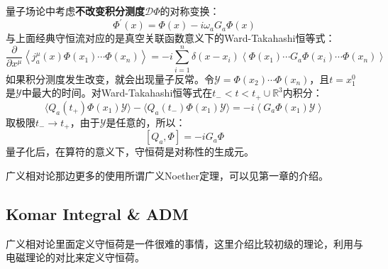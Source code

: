 量子场论中考虑\textbf{不改变积分测度$\mathcal{D}\Phi$}的对称变换：
\begin{equation}
	\Phi^{\prime}(x)=\Phi(x)-i\omega_aG_a\Phi(x)
\end{equation}
与上面经典守恒流对应的是真空关联函数意义下的Ward-Takahashi恒等式：
\begin{equation}
	\boxed{
		\frac\partial{\partial x^\mu}\left\langle j_a^\mu(x)\Phi(x_1)\cdots\Phi(x_n)\right\rangle   
		=-i\sum_{i=1}^n\delta(x-x_i)\left<\Phi(x_1)\cdots G_a\Phi(x_i)\cdots\Phi(x_n)\right>
	}
\end{equation}
如果积分测度发生改变，就会出现量子反常\cite{Bilal:2008qx}。令$\mathcal{Y}=\Phi(x_2)\cdots\Phi(x_n)$，且$t=x_1^0$是$\mathcal{Y}$中最大的时间。对Ward-Takahashi恒等式在${t_-<t<t_+}\cup \mathbb{R}^3$内积分：
\begin{equation}
	\langle Q_a(t_+)\Phi(x_1)\mathcal{Y}\rangle-\langle Q_a(t_-)\Phi(x_1)\mathcal{Y}\rangle=-i\left\langle G_a\Phi(x_1)\mathcal{Y}\right\rangle
\end{equation}
取极限$t_-\to t_+$，由于$\mathcal{Y}$是任意的，所以：
\begin{equation}
	\boxed{
	[Q_a,\Phi]=-iG_a\Phi }
\end{equation}
量子化后，在算符的意义下，守恒荷是对称性的生成元。

广义相对论那边更多的使用所谓广义Noether定理，可以见\cite{Compere:2019qed}第一章的介绍。
\subsection{Komar Integral \& ADM}
广义相对论里面定义守恒荷是一件很难的事情，这里介绍比较初级的理论，利用与电磁理论的对比来定义守恒荷。

